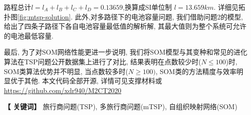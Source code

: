 {	路程总计$l = l_A +l_B+l_C+l_D = 0.13659$,换算成SI单位制 $l=13.659 km$. 详细见拓扑图\ref{fig:mtsp-solution}. 此外,对多路径下的电池容量问题, 我们借助问题2的模型, 给出了四条子路径下各自电池容量最低值的解析解, 其最大值则为整个系统可允许的电池最低容量.

	最后, 为了对SOM网络性能更进一步说明, 我们将SOM模型与其变种和常见的进化算法在TSP问题公开数据集上进行了对比, 结果表明在点数较少时($N \leq 100$)时, SOM类算法优势并不明显, 当点数较多时($N \geq 100)$, SOM类的方法精度与效率明显优于其他.
	 本文代码全部开源, 详情可见支撑材料或\url{https://github.com/xdr940/M2CT2020}

	
	\vskip 10bp
	
	\hspace{5bp} {\textbf{【 关键词】}} 
	旅行商问题(TSP), 多旅行商问题(mTSP), 自组织映射网络(SOM) 
}